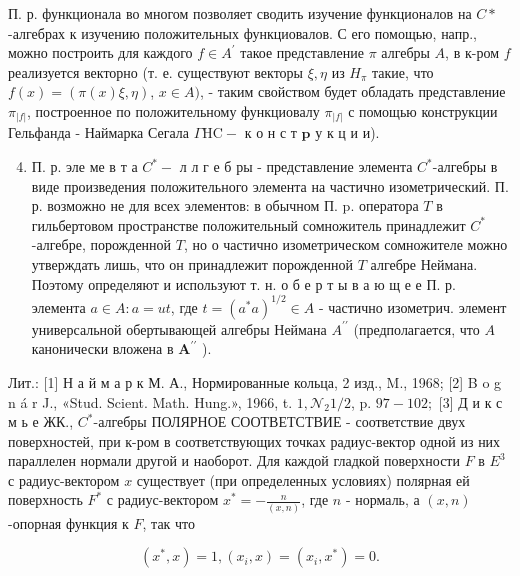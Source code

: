 \documentclass[10pt]{article}
\begin{document}
П. р. функционала во многом позволяет сводить изучение функционалов на $C *$-алгебрах к изучению положительных функциовалов. С его помощью, напр., можно построить для каждого $f \in A^{\prime}$ такое представление $\pi$ алгебры $A$, в к-ром $f$ реализуется векторно (т. е. существуют векторы $\xi, \eta$ из $H_{\pi}$ такие, что $f(x)=(\pi(x) \xi, \eta)$, $x \in A)$, - таким свойством будет обладать представление $\pi_{|f|}$, построенное по положительному функциовалу $\pi_{|f|}$ с помощью конструкции Гельфанда - Наймарка Сегала $\Gamma \mathrm{H} \mathrm{C}-$ к о н с т $\mathbf{p}$ у к ц и и).



\begin{enumerate}

  \setcounter{enumi}{3}

  \item П. р. эле ме в т а $C^{*}-$ л л г е б ры - представление элемента $C^{*}$-алгебры в виде произведения положительного элемента на частично изометрический. П. р. возможно не для всех элементов: в обычном П. p. оператора $T$ в гильбертовом пространстве положительный сомножитель принадлежит $C^{*}$-алгебре, порожденной $T$, но о частично изометрическом сомножителе можно утверждать лишь, что он принадлежит порожденной $T$ алгебре Неймана. Поэтому определяют и используют т. н. о б е р т ы в а ю щ е е П. р. элемента $a \in A: a=u t$, где $t=\left(a^{*} a\right)^{1 / 2} \in A$ - частично изометрич. элемент универсальной обертывающей алгебры Неймана $A^{\prime \prime}$ (предполагается, что $A$ канонически вложена в $\boldsymbol{A}^{\prime \prime}$ ).

\end{enumerate}



Лит.: [1] Н а й м а р к М. А., Нормированные кольца, 2 изд., M., 1968; [2] B o g n á r J., «Stud. Scient. Math. Hung.», 1966, t. $1, \mathcal{N}_{2} 1 / 2$, p. $97-102 ;$ [3] Д и к с м ь е ЖК., $C^{*}$-алгебры ПОЛЯРНОЕ СООТВЕТСТВИЕ - соответствие двух поверхностей, при к-ром в соответствующих точках радиус-вектор одной из них параллелен нормали другой и наоборот. Для каждой гладкой поверхности $F$ в $E^{3}$ с радиус-вектором $x$ существует (при определенных условиях) полярная ей поверхность $F^{*}$ с радиус-вектором $x^{*}=-\frac{n}{(x, n)}$, где $n$ - нормаль, а $(x, n)$-опорная функция к $F$, так что



\[

\left(x^{*}, x\right)=1,\left(x_{i}, x\right)=\left(x_{i}, x^{*}\right)=0 .

\]
\end{document}
